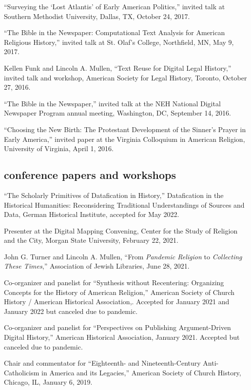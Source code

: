 \documentclass[11pt]{article}
\begin{document}
``Surveying the `Lost Atlantis' of Early American Politics,'' invited talk at 
Southern Methodist University, Dallas, TX, October 24, 2017.

``The Bible in the Newspaper: Computational Text Analysis for American 
Religious History,'' invited talk at St. Olaf's College, Northfield, MN, May 
9, 2017.

Kellen Funk and Lincoln A. Mullen, ``Text Reuse for Digital Legal History,'' 
invited talk and workshop, American Society for Legal History, Toronto, October 27, 2016.

``The Bible in the Newspaper,'' invited talk at the NEH National Digital Newspaper Program annual meeting, Washington, DC, September 14, 2016.

``Choosing the New Birth: The Protestant Development of the Sinner's Prayer in 
Early America,'' invited paper at the Virginia Colloquium in American 
Religion, University of Virginia, April 1, 2016.

\subsection{conference papers and workshops}\label{conference-papers}

``The Scholarly Primitives of Datafication in History,'' Datafication in the
Historical Humanities: Reconsidering Traditional Understandings of Sources and
Data, German Historical Institute, accepted for May 2022.

Presenter at the Digital Mapping Convening, Center for the Study of Religion and the City, Morgan State University, February 22, 2021.

John G. Turner and Lincoln A. Mullen, ``From \emph{Pandemic Religion} to \emph{Collecting These Times},'' Association of Jewish Libraries, June 28, 2021.

Co-organizer and panelist for ``Synthesis without Recentering: Organizing Concepts for the History of American Religion,'' American Society of Church History / American Historical Association,. Accepted for January 2021 and January 2022 but canceled due to pandemic.

Co-organizer and panelist for ``Perspectives on Publishing Argument-Driven Digital History,'' American Historical Association, January 2021. Accepted but canceled due to pandemic.

Chair and commentator for ``Eighteenth- and Nineteenth-Century Anti-Catholicism in America and its Legacies,'' American Society of Church History, Chicago, IL, January 6, 2019.
\end{document}
